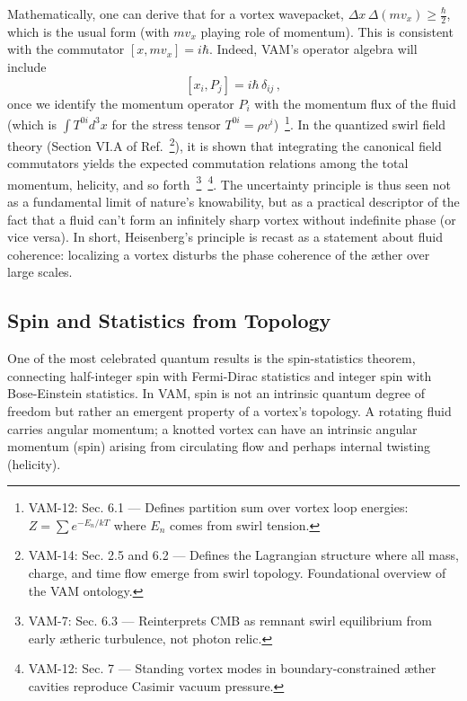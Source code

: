 \documentclass[a4paper,12pt]{article}
\begin{document}
    Mathematically, one can derive that for a vortex wavepacket, $\Delta x\, \Delta (m v_x) \ge \frac{\hbar}{2}$, which is the usual form (with $m v_x$ playing role of momentum). This is consistent with the commutator $[x, m v_x] = i\hbar$. Indeed, VAM’s operator algebra will include
    \[
        [x_i, P_j] = i\hbar\,\delta_{ij}\,,
    \]
    once we identify the momentum operator $P_i$ with the momentum flux of the fluid (which is $\int T^{0i} d^3x$ for the stress tensor $T^{0i} = \rho v^i$)~\footnote{VAM-12: Sec. 6.1 — Defines partition sum over vortex loop energies: $Z = \sum e^{-E_n/kT}$ where $E_n$ comes from swirl tension.}. In the quantized swirl field theory (Section VI.A of Ref.~\footnote{VAM-14: Sec. 2.5 and 6.2 — Defines the Lagrangian structure where all mass, charge, and time flow emerge from swirl topology. Foundational overview of the VAM ontology.}), it is shown that integrating the canonical field commutators yields the expected commutation relations among the total momentum, helicity, and so forth~\footnote{VAM-7: Sec. 6.3 — Reinterprets CMB as remnant swirl equilibrium from early ætheric turbulence, not photon relic.}~\footnote{VAM-12: Sec. 7 — Standing vortex modes in boundary-constrained æther cavities reproduce Casimir vacuum pressure.}. The uncertainty principle is thus seen not as a fundamental limit of nature’s knowability, but as a practical descriptor of the fact that a fluid can’t form an infinitely sharp vortex without indefinite phase (or vice versa). In short, Heisenberg’s principle is recast as a statement about fluid coherence: localizing a vortex disturbs the phase coherence of the æther over large scales.

    \subsection{Spin and Statistics from Topology}
    One of the most celebrated quantum results is the spin-statistics theorem, connecting half-integer spin with Fermi-Dirac statistics and integer spin with Bose-Einstein statistics. In VAM, spin is not an intrinsic quantum degree of freedom but rather an emergent property of a vortex’s topology. A rotating fluid carries angular momentum; a knotted vortex can have an intrinsic angular momentum (spin) arising from circulating flow and perhaps internal twisting (helicity).
\end{document}
